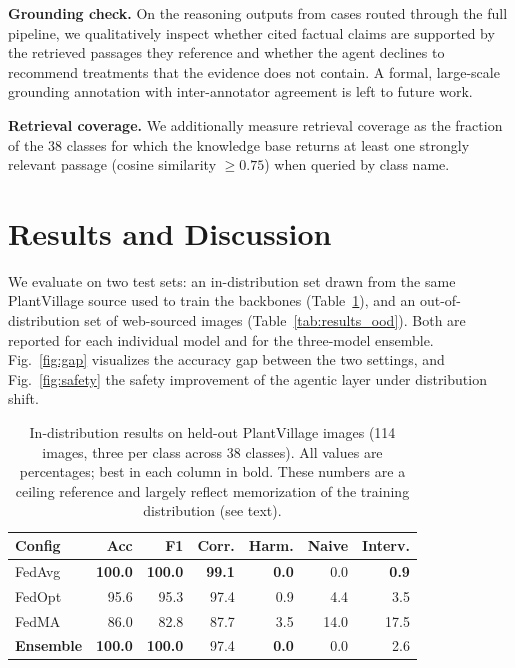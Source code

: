 \documentclass[conference]{IEEEtran}
\begin{document}
\textbf{Grounding check.} On the reasoning outputs from cases routed through the full pipeline, we qualitatively inspect whether cited factual claims are supported by the retrieved passages they reference and whether the agent declines to recommend treatments that the evidence does not contain. A formal, large-scale grounding annotation with inter-annotator agreement is left to future work.

\textbf{Retrieval coverage.} We additionally measure retrieval coverage as the fraction of the 38 classes for which the knowledge base returns at least one strongly relevant passage (cosine similarity $\geq 0.75$) when queried by class name.

\section{Results and Discussion}
\label{sec:results}

We evaluate on two test sets: an in-distribution set drawn from the same PlantVillage source used to train the backbones (Table~\ref{tab:results_id}), and an out-of-distribution set of web-sourced images (Table~\ref{tab:results_ood}). Both are reported for each individual model and for the three-model ensemble. Fig.~\ref{fig:gap} visualizes the accuracy gap between the two settings, and Fig.~\ref{fig:safety} the safety improvement of the agentic layer under distribution shift.

\begin{table}[t]
\centering
\caption{In-distribution results on held-out PlantVillage images (114 images, three per class across 38 classes). All values are percentages; best in each column in bold. These numbers are a ceiling reference and largely reflect memorization of the training distribution (see text).}
\label{tab:results_id}
\small
\setlength{\tabcolsep}{4pt}
\begin{tabular}{lrrrrrr}
\toprule
\textbf{Config} & \textbf{Acc} & \textbf{F1} & \textbf{Corr.} & \textbf{Harm.} & \textbf{Naive} & \textbf{Interv.} \\
\midrule
FedAvg & \textbf{100.0} & \textbf{100.0} & \textbf{99.1} & \textbf{0.0} & 0.0 & \textbf{0.9} \\
FedOpt & 95.6 & 95.3 & 97.4 & 0.9 & 4.4 & 3.5 \\
FedMA & 86.0 & 82.8 & 87.7 & 3.5 & 14.0 & 17.5 \\
\textbf{Ensemble} & \textbf{100.0} & \textbf{100.0} & 97.4 & \textbf{0.0} & 0.0 & 2.6 \\
\bottomrule
\end{tabular}
\end{table}
\end{document}
